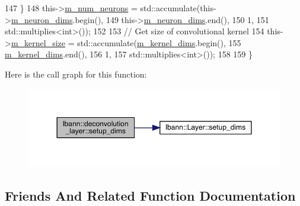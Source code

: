 \begin{DoxyCode}
147     \}
148     this->\hyperlink{classlbann_1_1Layer_a6b5ebc8a7d9329d8a773ed787e7b41d8}{m\_num\_neurons} = std::accumulate(this->\hyperlink{classlbann_1_1Layer_abb34bb8031f57a483e2e327a5f229f48}{m\_neuron\_dims}.begin(),
149                                           this->\hyperlink{classlbann_1_1Layer_abb34bb8031f57a483e2e327a5f229f48}{m\_neuron\_dims}.end(),
150                                           1,
151                                           std::multiplies<int>());
152 
153     \textcolor{comment}{// Get size of convolutional kernel}
154     this->\hyperlink{classlbann_1_1base__convolution__layer_aa9da3e44499643a86bd611b5eb500dd4}{m\_kernel\_size} = std::accumulate(\hyperlink{classlbann_1_1base__convolution__layer_a283edb6a476f975e713d0b4235ac658f}{m\_kernel\_dims}.begin(),
155                                           \hyperlink{classlbann_1_1base__convolution__layer_a283edb6a476f975e713d0b4235ac658f}{m\_kernel\_dims}.end(),
156                                           1,
157                                           std::multiplies<int>());
158 
159   \}
\end{DoxyCode}
Here is the call graph for this function\+:\nopagebreak
\begin{figure}[H]
\begin{center}
\leavevmode
\includegraphics[width=350pt]{classlbann_1_1deconvolution__layer_abec9b66f0659fd4f06a39a1e8c4bd06b_cgraph}
\end{center}
\end{figure}


\subsection{Friends And Related Function Documentation}
\mbox{\label{classlbann_1_1deconvolution__layer_a6d54673503b45aeb6526f041224900c6}} 
